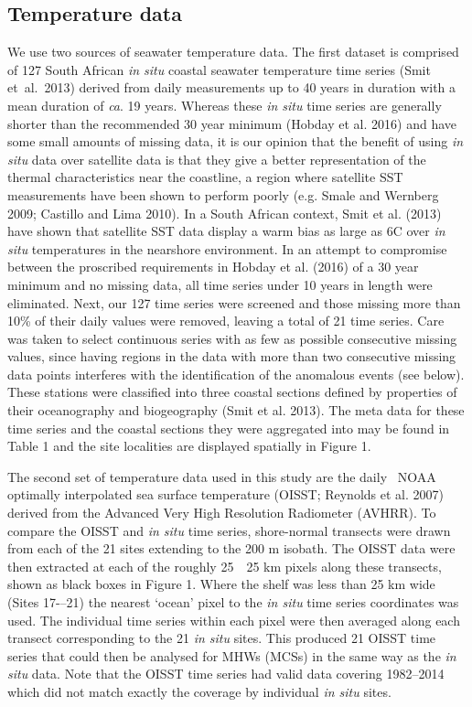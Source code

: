 \documentclass[a4paper,10pt,review]{elsarticle}
\begin{document}
\subsection{Temperature data}
We use two sources of seawater temperature data. The first dataset is comprised of 127 South African \emph{in situ} coastal seawater temperature time series (Smit et al. 2013) derived from daily measurements up to 40 years in duration with a mean duration of \emph{ca}. 19 years. Whereas these \emph{in situ} time series are generally shorter than the recommended 30 year minimum (Hobday et al. 2016) and have some small amounts of missing data, it is our opinion that the benefit of using \emph{in situ} data over satellite data is that they give a better representation of the thermal characteristics near the coastline, a region where satellite SST measurements have been shown to perform poorly (e.g. Smale and Wernberg 2009; Castillo and Lima 2010). In a South African context, Smit et al. (2013) have shown that satellite SST data display a warm bias as large as 6\degree C over \emph{in situ} temperatures in the nearshore environment. In an attempt to compromise between the proscribed requirements in Hobday et al. (2016) of a 30 year minimum and no missing data, all time series under 10 years in length were eliminated. Next, our 127 time series were screened and those missing more than 10\% of their daily values were removed, leaving a total of 21 time series. Care was taken to select continuous series with as few as possible consecutive missing values, since having regions in the data with more than two consecutive missing data points interferes with the identification of the anomalous events (see below). These stations were classified into three coastal sections defined by properties of their oceanography and biogeography (Smit et al. 2013). The meta data for these time series and the coastal sections they were aggregated into may be found in Table 1 and the site localities are displayed spatially in Figure 1.

The second set of temperature data used in this study are the daily \degree~NOAA optimally interpolated sea surface temperature (OISST; Reynolds et al. 2007) derived from the Advanced Very High Resolution Radiometer (AVHRR). To compare the OISST and \emph{in situ} time series, shore-normal transects were drawn from each of the 21 sites extending to the 200 m isobath. The OISST data were then extracted at each of the roughly 25~\texttimes~25 km pixels along these transects, shown as black boxes in Figure 1. Where the shelf was less than 25 km wide (Sites 17-–21) the nearest `ocean' pixel to the \emph{in situ} time series coordinates was used. The individual time series within each pixel were then averaged along each transect corresponding to the 21 \emph{in situ} sites. This produced 21 OISST time series that could then be analysed for MHWs (MCSs) in the same way as the \emph{in situ} data. Note that the OISST time series had valid data covering 1982--2014 which did not match exactly the coverage by individual \emph{in situ} sites.
\end{document}
